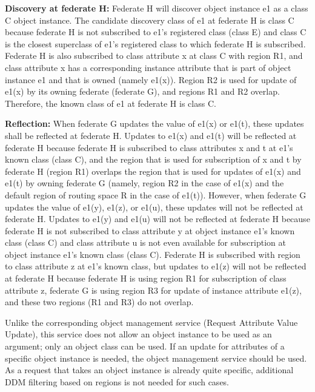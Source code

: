 \begin{annexstdpage}
    \begin{stddashlist}
        \item \textbf{Discovery at federate H:} Federate H will discover object instance e1 as a class C object instance. The candidate discovery class of e1 at federate H is class C because federate H is not subscribed to e1's registered class (class E) and class C is the closest superclass of e1's registered class to which federate H is subscribed. Federate H is also subscribed to class attribute x at class C with region R1, and class attribute x has a corresponding instance attribute that is part of object instance e1 and that is owned (namely e1(x)). Region R2 is used for update of e1(x) by its owning federate (federate G), and regions R1 and R2 overlap. Therefore, the known class of e1 at federate H is class C.
        \item \textbf{Reflection:} When federate G updates the value of e1(x) or e1(t), these updates shall be reflected at federate H. Updates to e1(x) and e1(t) will be reflected at federate H because federate H is subscribed to class attributes x and t at e1's known class (class C), and the region that is used for subscription of x and t by federate H (region R1) overlaps the region that is used for updates of e1(x) and e1(t) by owning federate G (namely, region R2 in the case of e1(x) and the default region of routing space R in the case of e1(t)). However, when federate G updates the value of e1(y), e1(z), or e1(u), these updates will not be reflected at federate H. Updates to e1(y) and e1(u) will not be reflected at federate H because federate H is not subscribed to class attribute y at object instance e1's known class (class C) and class attribute u is not even available for subscription at object instance e1's known class (class C). Federate H is subscribed with region to class attribute z at e1's known class, but updates to e1(z) will not be reflected at federate H because federate H is using region R1 for subscription of class attribute z, federate G is using region R3 for update of instance attribute e1(z), and these two regions (R1 and R3) do not overlap.
    \end{stddashlist}


    Unlike the corresponding object management service (Request Attribute Value Update), this service does not allow an object instance to be used as an argument; only an object class can be used. If an update for attributes of a specific object instance is needed, the object management service should be used. As a request that takes an object instance is already quite specific, additional DDM filtering based on regions is not needed for such cases.


\end{annexstdpage}
